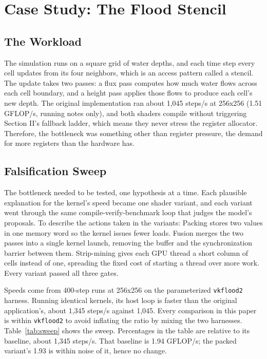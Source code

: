 \documentclass[conference]{IEEEtran}
\begin{document}
\section{Case Study: The Flood
Stencil}\label{case-study-the-flood-stencil}

\subsection{The Workload}\label{the-workload}

The simulation runs on a square grid of water depths, and each time step
every cell updates from its four neighbors, which is an access pattern
called a stencil. The update takes two passes: a flux pass computes how
much water flows across each cell boundary, and a height pass applies
those flows to produce each cell's new depth. The original
implementation ran about 1,045 steps/s at 256x256 (1.51 GFLOP/s, running
notes only), and both shaders compile without triggering Section II's
fallback ladder, which means they never stress the register allocator.
Therefore, the bottleneck was something other than register pressure,
the demand for more registers than the hardware has.

\subsection{Falsification Sweep}\label{falsification-sweep}

The bottleneck needed to be tested, one hypothesis at a time. Each
plausible explanation for the kernel's speed became one shader variant,
and each variant went through the same compile-verify-benchmark loop
that judges the model's proposals. To describe the actions taken in the
variants: Packing stores two values in one memory word so the kernel
issues fewer loads. Fusion merges the two passes into a single kernel
launch, removing the buffer and the synchronization barrier between
them. Strip-mining gives each GPU thread a short column of cells instead
of one, spreading the fixed cost of starting a thread over more work.
Every variant passed all three gates.

Speeds come from 400-step runs at 256x256 on the parameterized
\texttt{vkflood2} harness. Running identical kernels, its host loop is
faster than the original application's, about 1,345 steps/s against
1,045. Every comparison in this paper is within \texttt{vkflood2} to
avoid inflating the ratio by mixing the two harnesses.
Table~\ref{tab:sweep} shows the sweep. Percentages in
the table are relative to its baseline, about 1,345 steps/s. That
baseline is 1.94 GFLOP/s; the packed variant's 1.93 is within noise of
it, hence no change.
\end{document}
